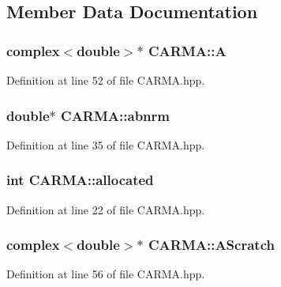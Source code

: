 \subsection{Member Data Documentation}
\hypertarget{class_c_a_r_m_a_af80126208923015a2149c11314bbc798}{
\subsubsection[{A}]{\setlength{\rightskip}{0pt plus 5cm}complex$<$double$>$$\ast$ C\-A\-R\-M\-A\-::\-A}}\label{class_c_a_r_m_a_af80126208923015a2149c11314bbc798}


Definition at line 52 of file C\-A\-R\-M\-A.\-hpp.

\hypertarget{class_c_a_r_m_a_a38d4be056f99144dd726b8a522873200}{
\subsubsection[{abnrm}]{\setlength{\rightskip}{0pt plus 5cm}double$\ast$ C\-A\-R\-M\-A\-::abnrm}}\label{class_c_a_r_m_a_a38d4be056f99144dd726b8a522873200}


Definition at line 35 of file C\-A\-R\-M\-A.\-hpp.

\hypertarget{class_c_a_r_m_a_a54245682ab3eba1ba3fde0898f9898a6}{
\subsubsection[{allocated}]{\setlength{\rightskip}{0pt plus 5cm}int C\-A\-R\-M\-A\-::allocated}}\label{class_c_a_r_m_a_a54245682ab3eba1ba3fde0898f9898a6}


Definition at line 22 of file C\-A\-R\-M\-A.\-hpp.

\hypertarget{class_c_a_r_m_a_a5ccd955a53c7473f750a8d03934d49cc}{
\subsubsection[{A\-Scratch}]{\setlength{\rightskip}{0pt plus 5cm}complex$<$double$>$$\ast$ C\-A\-R\-M\-A\-::\-A\-Scratch}}\label{class_c_a_r_m_a_a5ccd955a53c7473f750a8d03934d49cc}


Definition at line 56 of file C\-A\-R\-M\-A.\-hpp.

